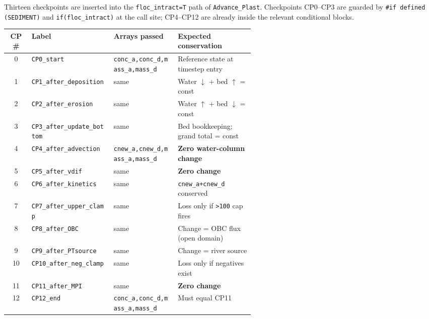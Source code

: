 \documentclass[11pt]{article}
\begin{document}
Thirteen checkpoints are inserted into the \texttt{floc\_intract=T} path of
\texttt{Advance\_Plast}.  Checkpoints CP0--CP3 are guarded by
\texttt{\#if defined (SEDIMENT)} and \texttt{if(floc\_intract)} at the call site;
CP4--CP12 are already inside the relevant conditional blocks.

\begin{table}[h]
\centering
\small
\begin{tabular}{clp{0.26\linewidth}p{0.31\linewidth}}
\toprule
CP\# & Label & Arrays passed & Expected conservation \\
\midrule
0  & \texttt{CP0\_start}             & \texttt{conc\_a,conc\_d,mass\_a,mass\_d}  & Reference state at timestep entry \\
1  & \texttt{CP1\_after\_deposition} & same                                      & Water $\downarrow$ + bed $\uparrow$ = const \\
2  & \texttt{CP2\_after\_erosion}    & same                                      & Water $\uparrow$ + bed $\downarrow$ = const \\
3  & \texttt{CP3\_after\_update\_bottom} & same                                  & Bed bookkeeping; grand total = const \\
4  & \texttt{CP4\_after\_advection}  & \texttt{cnew\_a,cnew\_d,mass\_a,mass\_d} & \textbf{Zero water-column change} \\
5  & \texttt{CP5\_after\_vdif}       & same                                      & \textbf{Zero change} \\
6  & \texttt{CP6\_after\_kinetics}   & same                                      & \texttt{cnew\_a+cnew\_d} conserved \\
7  & \texttt{CP7\_after\_upper\_clamp} & same                                    & Loss only if \texttt{>100} cap fires \\
8  & \texttt{CP8\_after\_OBC}        & same                                      & Change = OBC flux (open domain) \\
9  & \texttt{CP9\_after\_PTsource}   & same                                      & Change = river source \\
10 & \texttt{CP10\_after\_neg\_clamp} & same                                     & Loss only if negatives exist \\
11 & \texttt{CP11\_after\_MPI}       & same                                      & \textbf{Zero change} \\
12 & \texttt{CP12\_end}              & \texttt{conc\_a,conc\_d,mass\_a,mass\_d}  & Must equal CP11 \\
\bottomrule
\end{tabular}
\end{table}
\end{document}
